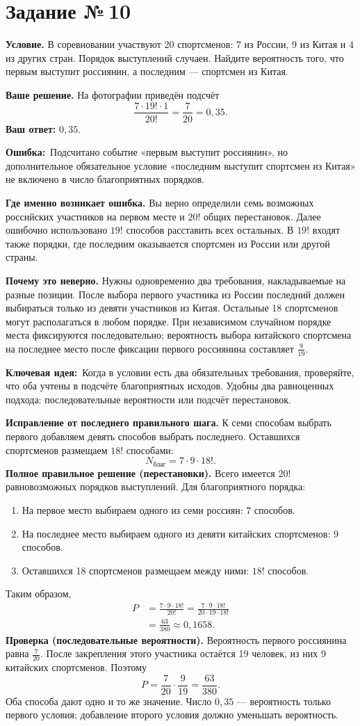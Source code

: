 \documentclass[a4paper,12pt]{article}
\newcommand{\errlabel}{\textcolor{err}{\textbf{Ошибка:}}}
\newcommand{\keylabel}{\textcolor{accent}{\textbf{Ключевая идея:}}}
\newcommand{\reviewtask}[1]{\clearpage\phantomsection\label{task:#1}\section*{\textcolor{accent}{Задание №\,#1}}}
\begin{document}
\reviewtask{10}
\begingroup\small\setlength{\parskip}{2pt}
\textbf{Условие.} В соревновании участвуют 20 спортсменов: 7 из России, 9 из Китая и 4 из других стран. Порядок выступлений случаен. Найдите вероятность того, что первым выступит россиянин, а последним --- спортсмен из Китая.

\textbf{Ваше решение.} На фотографии приведён подсчёт
\[
\frac{7\cdot19!\cdot1}{20!}=\frac7{20}=0{,}35.
\]
\textbf{Ваш ответ:} $0{,}35$.

\errlabel\ Подсчитано событие «первым выступит россиянин», но дополнительное обязательное условие «последним выступит спортсмен из Китая» не включено в число благоприятных порядков.

\textbf{Где именно возникает ошибка.} Вы верно определили семь возможных российских участников на первом месте и $20!$ общих перестановок. Далее ошибочно использовано $19!$ способов расставить всех остальных. В $19!$ входят также порядки, где последним оказывается спортсмен из России или другой страны.

\textbf{Почему это неверно.} Нужны одновременно два требования, накладываемые на разные позиции. После выбора первого участника из России последний должен выбираться только из девяти участников из Китая. Остальные 18 спортсменов могут располагаться в любом порядке. При независимом случайном порядке места фиксируются последовательно; вероятность выбора китайского спортсмена на последнее место после фиксации первого россиянина составляет $\frac9{19}$.

\keylabel\ Когда в условии есть два обязательных требования, проверяйте, что оба учтены в подсчёте благоприятных исходов. Удобны два равноценных подхода: последовательные вероятности или подсчёт перестановок.

\textbf{Исправление от последнего правильного шага.} К семи способам выбрать первого добавляем девять способов выбрать последнего. Оставшихся спортсменов размещаем $18!$ способами:
\[
N_{\text{благ}}=7\cdot9\cdot18!.
\]
\textbf{Полное правильное решение (перестановки).} Всего имеется $20!$ равновозможных порядков выступлений. Для благоприятного порядка:
\begin{enumerate}
\item На первое место выбираем одного из семи россиян: $7$ способов.
\item На последнее место выбираем одного из девяти китайских спортсменов: $9$ способов.
\item Оставшихся 18 спортсменов размещаем между ними: $18!$ способов.
\end{enumerate}
Таким образом,
\begin{align*}
P&=\frac{7\cdot9\cdot18!}{20!}
=\frac{7\cdot9\cdot18!}{20\cdot19\cdot18!}\\
&=\frac{63}{380}\approx0{,}1658.
\end{align*}
\textbf{Проверка (последовательные вероятности).} Вероятность первого россиянина равна $\frac7{20}$. После закрепления этого участника остаётся 19 человек, из них 9 китайских спортсменов. Поэтому
\[
P=\frac7{20}\cdot\frac9{19}=\frac{63}{380}.
\]
Оба способа дают одно и то же значение. Число $0{,}35$ --- вероятность только первого условия; добавление второго условия должно уменьшать вероятность.
\end{document}
